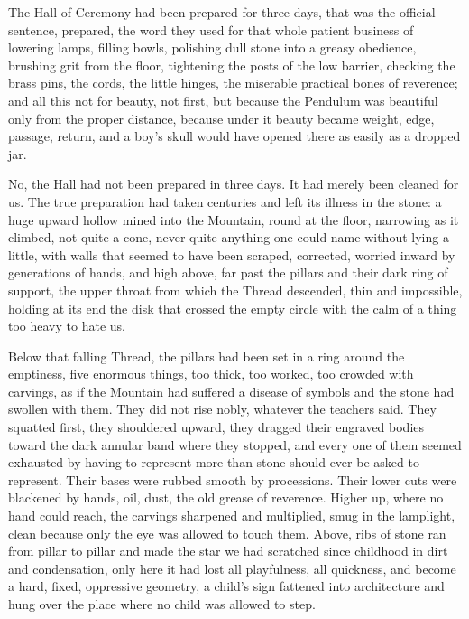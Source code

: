 


The Hall of Ceremony had been prepared for three days, that was the official sentence, prepared, the word they used for that whole patient 
business of lowering lamps, filling bowls, polishing dull stone into a greasy obedience, brushing grit from the floor, tightening the posts 
of the low barrier, checking the brass pins, the cords, the little hinges, the miserable practical bones of reverence; and all this not for 
beauty, not first, but because the Pendulum was beautiful only from the proper distance, because under it beauty became weight, edge, 
passage, return, and a boy’s skull would have opened there as easily as a dropped jar.\par

No, the Hall had not been prepared in three days. It had merely been cleaned for us. The true preparation had taken centuries 
and left its illness in the stone: a huge upward hollow mined into the Mountain, round at the floor, narrowing as it climbed, 
not quite a cone, never quite anything one could name without lying a little, with walls that seemed to have been scraped, corrected, 
worried inward by generations of hands, and high above, far past the pillars and their dark ring of support, the upper throat from 
which the Thread descended, thin and impossible, holding at its end the disk that crossed the empty circle with the calm of a thing 
too heavy to hate us.\par


Below that falling Thread, the pillars had been set in a ring around the emptiness, five enormous things, too thick, too worked, too crowded with carvings, 
as if the Mountain had suffered a disease of symbols and the stone had swollen with them. They did not rise nobly, whatever the teachers said. 
They squatted first, they shouldered upward, they dragged their engraved bodies toward the dark annular band where they stopped, 
and every one of them seemed exhausted by having to represent more than stone should ever be asked to represent. 
Their bases were rubbed smooth by processions. 
Their lower cuts were blackened by hands, oil, dust, the old grease of reverence. 
Higher up, where no hand could reach, the carvings sharpened and multiplied, smug in the lamplight, clean because only the eye was allowed to touch them. 
Above, ribs of stone ran from pillar to pillar and made the star we had scratched since childhood in dirt and condensation, only here it had lost all 
playfulness, all quickness, and become a hard, fixed, oppressive geometry, a child’s sign fattened into architecture and hung over the place where no child was allowed to step.\par

